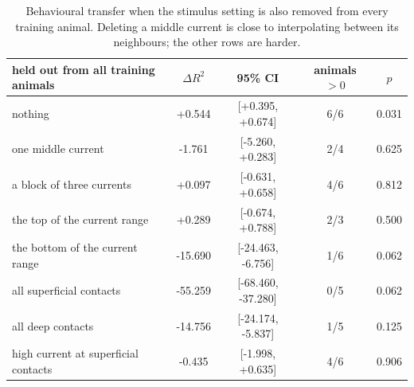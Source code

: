\begin{table}[h]\centering\small
\caption{Behavioural transfer when the stimulus setting is also removed from every training animal. Deleting a middle current is close to interpolating between its neighbours; the other rows are harder.}
\label{tab:holdout}
\begin{tabular}{lcccc}
\toprule
held out from all training animals & $\Delta R^2$ & 95\% CI & animals $>0$ & $p$ \\
\midrule
nothing & +0.544 & [+0.395, +0.674] & 6/6 & 0.031 \\
one middle current & -1.761 & [-5.260, +0.283] & 2/4 & 0.625 \\
a block of three currents & +0.097 & [-0.631, +0.658] & 4/6 & 0.812 \\
the top of the current range & +0.289 & [-0.674, +0.788] & 2/3 & 0.500 \\
the bottom of the current range & -15.690 & [-24.463, -6.756] & 1/6 & 0.062 \\
all superficial contacts & -55.259 & [-68.460, -37.280] & 0/5 & 0.062 \\
all deep contacts & -14.756 & [-24.174, -5.837] & 1/5 & 0.125 \\
high current at superficial contacts & -0.435 & [-1.998, +0.635] & 4/6 & 0.906 \\
\bottomrule
\end{tabular}
\end{table}
